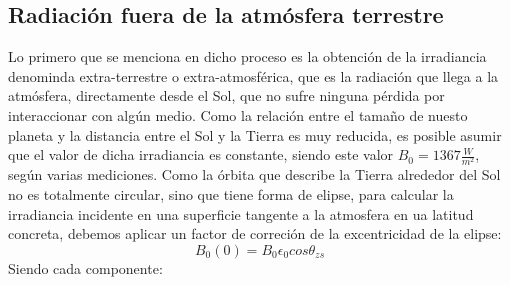 \subsection{Radiación fuera de la atmósfera terrestre}
\label{sec:orgd663c36}
\label{subsec:radiacion-fuera-atmosfera-terrestre}
Lo primero que se menciona en dicho proceso es la obtención de la irradiancia denominda extra-terrestre o extra-atmosférica, que es la radiación que llega a la atmósfera, directamente desde el Sol, que no sufre ninguna pérdida por interaccionar con algún medio. Como la relación entre el tamaño de nuesto planeta y la distancia entre el Sol y la Tierra es muy reducida, es posible asumir que el valor de dicha irradiancia es constante, siendo este valor \(B_0=1367\frac{W}{m^2}\), según varias mediciones.
Como la órbita que describe la Tierra alrededor del Sol no es totalmente circular, sino que tiene forma de elipse, para calcular la irradiancia incidente en una superficie tangente a la atmosfera en ua latitud concreta, debemos aplicar un factor de correción de la excentricidad de la elipse:
\begin{equation}
B_0(0)=B_0\epsilon_0cos\theta_{zs}
\label{eq:irrad_horiz}
\end{equation}
Siendo cada componente:
